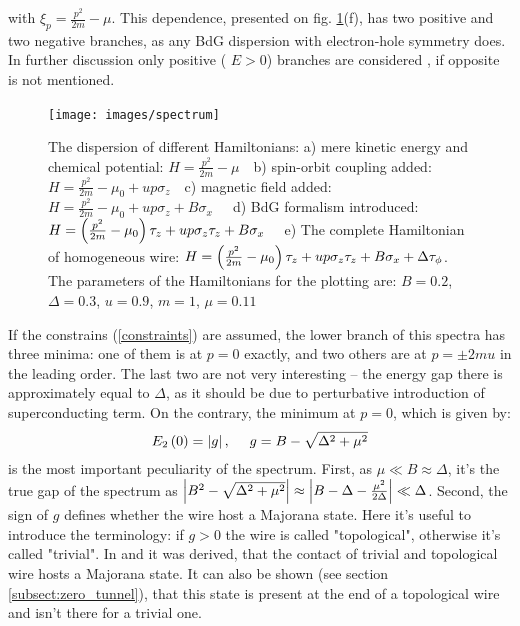 with $ \xi_p =\frac{p^2}{2m}-\mu$. This dependence, presented on fig. \ref{fig:spectrum}(f), has two positive and two negative branches, as any BdG dispersion with electron-hole symmetry does. In further discussion only positive (	$ E>0 $) branches are considered $  $, if opposite is not mentioned.

\begin{figure}[H]
	\centering
	\texttt{[image: images/spectrum]}
	\caption{The dispersion of different Hamiltonians:
		 a)  mere kinetic energy and chemical potential: $ H =\frac{ p^2}{2m} - \mu ~~~$
		 b) spin-orbit coupling added: $ 	H = \frac{p^2}{2m}-\mu_0 + u p \sigma_z ~~~$
		 c) magnetic field added: $ 	H = \frac{p^2}{2m} 	-\mu_0  +u p \sigma_z  + B\sigma_x ~~~~~$
		 d) BdG formalism introduced: $ 	H = \left(\frac{p^2}{2m} 	-\mu_0 \right)\tau_z +u p \sigma_z \tau_z + B\sigma_x	~~~ $
		 e) The complete Hamiltonian of homogeneous wire: $ 	H = \left(\frac{p^2}{2m} 	-\mu_0 \right)\tau_z +u p \sigma_z \tau_z + B\sigma_x	+ \Delta\tau_\phi $.
		 The parameters of the Hamiltonians for the plotting are: $ B=0.2 $, $ \Delta=0.3 $, $ u=0.9 $, $ m = 1 $, $ \mu = 0.11 $ 
 }
	\label{fig:spectrum}
\end{figure}

If the constrains (\ref{constraints}) are assumed, the lower branch of this spectra has three minima: one of them is at $ p=0 $ exactly, and two others are at $ p = \pm 2mu $ in the leading order. The last two are not very interesting -- the energy gap  there is approximately equal to $ \Delta $, as it should be due to perturbative introduction of superconducting term. On the contrary, the minimum at $ p=0 $, which is given by\cite{Oreg_2010}:
\begin{gather}
	E_2\left(0\right)=\left|g\right|,~~~~g = B -\sqrt{\Delta^2+\mu^2}
\end{gather}
is the most important peculiarity of the spectrum. First, as $\mu\ll B \approx \Delta $, it's the true gap of the spectrum as $  \left|B^2 -\sqrt{\Delta^2+\mu^2}\right| \approx  \left|B-\Delta -\frac{\mu^2}{2\Delta}\right|\ll\Delta$. Second, the  sign of  $ g $ defines whether the wire host a Majorana state. Here it's useful to introduce the terminology: if $ g>0 $ the wire is called "topological", otherwise it's called "trivial". In \cite{Oreg_2010} and \cite{Lutchyn_2010} it was derived, that the contact of trivial and topological wire hosts a Majorana state. It can also be shown (see section \ref{subsect:zero_tunnel}), that this state is present at the end of a topological wire and isn't there for a trivial one.

